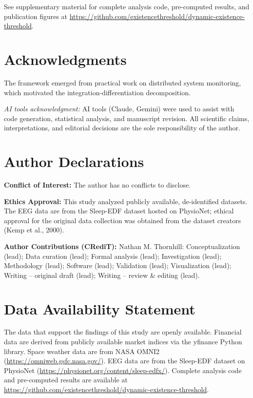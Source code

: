 \documentclass[aip,cha,reprint,amsmath,amssymb,final]{revtex4-2}
\begin{document}
See supplementary material for complete analysis code, pre-computed results, and publication figures at \url{https://github.com/existencethreshold/dynamic-existence-threshold}.

\section*{Acknowledgments}
The framework emerged from practical work on distributed system monitoring, which motivated the integration-differentiation decomposition.

\emph{AI tools acknowledgment:} AI tools (Claude, Gemini) were used to assist with code generation, statistical analysis, and manuscript revision. All scientific claims, interpretations, and editorial decisions are the sole responsibility of the author.

\section*{Author Declarations}

\noindent\textbf{Conflict of Interest:} The author has no conflicts to disclose.
\medskip

\noindent\textbf{Ethics Approval:} This study analyzed publicly available, de-identified datasets. The EEG data are from the Sleep-EDF dataset hosted on PhysioNet; ethical approval for the original data collection was obtained from the dataset creators (Kemp et al., 2000).
\medskip

\noindent\textbf{Author Contributions (CRediT):} Nathan M. Thornhill: Conceptualization (lead); Data curation (lead); Formal analysis (lead); Investigation (lead); Methodology (lead); Software (lead); Validation (lead); Visualization (lead); Writing -- original draft (lead); Writing -- review \& editing (lead).

\section*{Data Availability Statement}

The data that support the findings of this study are openly available. Financial data are derived from publicly available market indices via the yfinance Python library. Space weather data are from NASA OMNI2 (\url{https://omniweb.gsfc.nasa.gov/}). EEG data are from the Sleep-EDF dataset on PhysioNet (\url{https://physionet.org/content/sleep-edfx/}). Complete analysis code and pre-computed results are available at \url{https://github.com/existencethreshold/dynamic-existence-threshold}.
\end{document}

